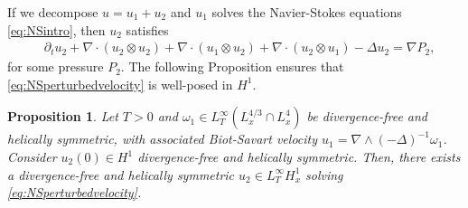 \documentclass[11pt,a4paper]{article}
\newcommand{\pa}{\partial}
\newcommand{\na}{\nabla}
\newtheorem{prop}[thm]{Proposition}
\begin{document}
If we decompose $u=u_1+u_2$ and $u_1$ solves the Navier-Stokes equations \eqref{eq:NSintro}, then $u_2$ satisfies
\begin{equation}\label{eq:NSperturbedvelocity}
\begin{aligned}
&\pa_t u_2+\na\cdot (u_2\otimes u_2)+\na\cdot (u_1\otimes u_2)+\na\cdot (u_2\otimes u_1)-\Delta u_2=\nabla P_2,
\end{aligned}
\end{equation}
for some pressure $P_2$. The following Proposition ensures that \eqref{eq:NSperturbedvelocity} is well-posed in $H^1$.

\begin{prop}\label{prop:perturbedNSlongtimeWP}
Let $T>0$ and $\omega_1\in L^\infty_T(L^{4/3}_x\cap L^4_x)$ be divergence-free and helically symmetric, with associated Biot-Savart velocity $u_1=\nabla\wedge(-\Delta)^{-1}\omega_1$. 
Consider $u_2(0)\in H^1$ divergence-free and helically symmetric. Then, there exists a divergence-free and helically symmetric $u_2\in L^\infty_TH^1_x$ solving \eqref{eq:NSperturbedvelocity}. 
\end{prop}
\end{document}
